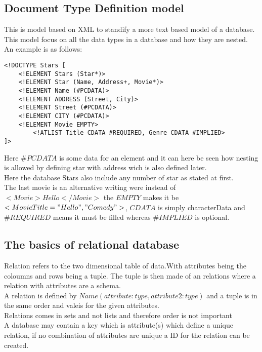 \documentclass[12pt, a4paper]{article}
\begin{document}
		\subsection{Document Type Definition model}
			This is model based on XML to standify a more text based model of a database. This model focus on all the data types in a database and how they are nested.
			An example is as follows:
			\begin{lstlisting}            
<!DOCTYPE Stars [
	<!ELEMENT Stars (Star*)>
	<!ELEMENT Star (Name, Address+, Movie*)>
	<!ELEMENT Name (#PCDATA)>
	<!ELEMENT ADDRESS (Street, City)>
	<!ELEMENT Street (#PCDATA)>
	<!ELEMENT CITY (#PCDATA)>
	<!ELEMENT Movie EMPTY>
		<!ATLIST Title CDATA #REQUIRED, Genre CDATA #IMPLIED>
]>
		\end{lstlisting}
		Here $\#PCDATA$ is some data for an element and it can here be seen how nesting is allowed by defining star with address wich is also defined later.\\
		Here the database Stars also include any number of star as stated at first.\\
		The last movie is an alternative writing were instead of $<Movie>Hello</Movie>$ the $EMPTY$ makes it be $<Movie Title="Hello", "Comedy">$, $CDATA$ is simply characterData and $\#REQUIRED$ means it must be filled whereas $\#IMPLIED$ is optional.
		\subsection{The basics of relational database}
			Relation refers to the two dimensional table of data.With attributes being the coloumns and rows being a tuple. The tuple is then made of an relations where a relation with attributes are a schema. \\
			A relation is defined by $Name(attribute:type, attribute2: type)$ and a tuple is in the same order and valeis for the given attributes.\\
			Relations comes in sets and not lists and therefore order is not important\\
			A database may contain a key which is attribute(s) which define a unique relation, if no combination of attributes are unique a ID for the relation can be created.\\
\end{document}
